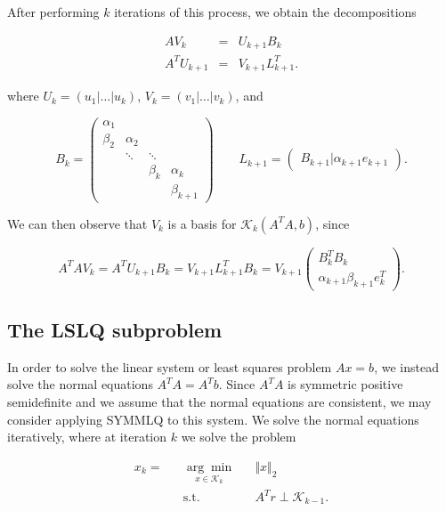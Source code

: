 \documentclass[11pt]{article}
\newcommand{\KK}{\mathcal{K}_k}
\begin{document}
After performing $k$ iterations of this process, we obtain the decompositions

\begin{eqnarray}
\label{GKdcmp1}
A V_k &=& U_{k+1} B_k \\
\label{GKdcmp2}
A^T U_{k+1} &=& V_{k+1} L^T_{k+1}.
\end{eqnarray}

where $U_k = \left( u_1  | \dots | u_k \right)$, $V_k = \left( v_1 | \dots | v_k \right)$, and

\begin{equation*}
B_k = \begin{pmatrix}
\alpha_1 & & & \\
\beta_2 & \alpha_2 & & \\
 & \ddots & \ddots & \\
 & & \beta_k & \alpha_k \\
 & & & \beta_{k+1} 
\end{pmatrix} \qquad L_{k+1} = \begin{pmatrix}
B_{k+1} | \alpha_{k+1} e_{k+1}
\end{pmatrix}.
\end{equation*}

We can then observe that $V_k$ is a basis for $\KK (A^T A, b)$, since

$$ A^T A V_k = A^T U_{k+1} B_k = V_{k+1} L^T_{k+1} B_k = V_{k+1} \begin{pmatrix}
B^T_k B_k \\
\alpha_{k+1} \beta_{k+1} e^T_k
\end{pmatrix}.
$$

\subsection{The LSLQ subproblem}
In order to solve the linear system or least squares problem $Ax = b$, we instead solve the normal equations $A^T A = A^T b$. Since $A^T A$ is symmetric positive semidefinite and we assume that the normal equations are consistent, we may consider applying SYMMLQ to this system.
We solve the normal equations iteratively, where at iteration $k$ we solve the problem

\begin{equation}
\label{lslqsubproblem}
\begin{aligned}
x_k =&& \underset{x \in \KK}{\arg\min} && \Vert x \Vert_2 \\
&& \text{s.t.} && A^T r \perp \mathcal{K}_{k-1}.
\end{aligned}
\end{equation}
\end{document}
